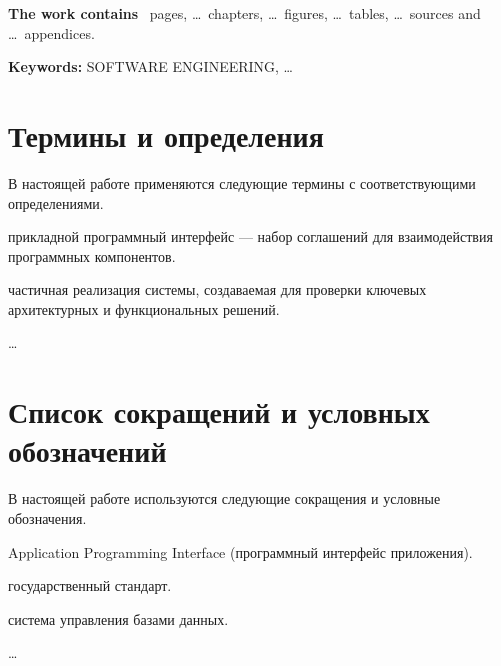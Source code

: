 \documentclass[12pt,a4paper]{extreport}
\begin{document}
\medskip
\textbf{The work contains} \pageref{LastPage}~pages, \ldots~chapters,
\ldots~figures, \ldots~tables, \ldots~sources and \ldots~appendices.

\medskip
\textbf{Keywords:} SOFTWARE ENGINEERING, \ldots

\clearpage

\tableofcontents
\clearpage


\chapter*{Термины и определения}

В настоящей работе применяются следующие термины с соответствующими
определениями.

\begin{description}[leftmargin=0pt, labelindent=0pt, font=\bfseries, style=nextline]
  \item[API] прикладной программный интерфейс — набор соглашений
    для взаимодействия программных компонентов.
  \item[Прототип] частичная реализация системы, создаваемая для
    проверки ключевых архитектурных и функциональных решений.
  \item[\ldots] \ldots\ %
\end{description}

\clearpage

\chapter*{Список сокращений и условных обозначений}

В настоящей работе используются следующие сокращения и условные
обозначения.

\begin{description}[leftmargin=0pt, labelindent=0pt, font=\bfseries, style=nextline]
  \item[API] Application Programming Interface (программный интерфейс приложения).
  \item[ГОСТ] государственный стандарт.
  \item[СУБД] система управления базами данных.
  \item[\ldots] \ldots\ %
\end{description}
\end{document}

